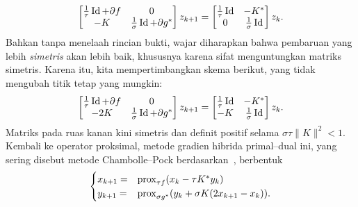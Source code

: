\begin{equation}
    \begin{bmatrix}
        \frac{1}{\tau}\operatorname{\mathrm{Id}}+ \partial f&0\\
        -K&\frac{1}{\sigma}\operatorname{\mathrm{Id}} + \partial g^*
    \end{bmatrix}
    z_{k+1} =
    \begin{bmatrix}
        \frac{1}{\tau}\operatorname{\mathrm{Id}}& - K^*\\
        0& \frac{1}{\sigma}\operatorname{\mathrm{Id}}
    \end{bmatrix}
    z_k.
\end{equation}
Bahkan tanpa menelaah rincian bukti, wajar diharapkan bahwa pembaruan yang lebih \emph{simetris} akan lebih baik, khususnya karena sifat menguntungkan matriks simetris. Karena itu, kita mempertimbangkan skema berikut, yang tidak mengubah titik tetap yang mungkin:
\begin{equation}
    \begin{bmatrix}
        \frac{1}{\tau}\operatorname{\mathrm{Id}}+ \partial f&0\\
        -2K&\frac{1}{\sigma}\operatorname{\mathrm{Id}} + \partial g^*
    \end{bmatrix}
    z_{k+1} =
    \begin{bmatrix}
        \frac{1}{\tau}\operatorname{\mathrm{Id}}& -K^*\\
        -K & \frac{1}{\sigma}\operatorname{\mathrm{Id}}
    \end{bmatrix}
    z_k.
\end{equation}
Matriks pada ruas kanan kini simetris dan definit positif selama $\sigma\tau \|K\|^2<1$.
Kembali ke operator proksimal, metode gradien hibrida primal--dual ini, yang sering disebut metode Chambolle--Pock berdasarkan~\cite{chambolle2011first}, berbentuk
\begin{equation}\label{duality:eq:pdhg}
    \begin{cases}
        x_{k+1} =& \mathrm{prox}_{\tau f}(x_k-\tau K^*y_k)\\
        y_{k+1} =& \mathrm{prox}_{\sigma g^*}(y_k+\sigma K(2x_{k+1}-x_k)).
    \end{cases}
\end{equation}

